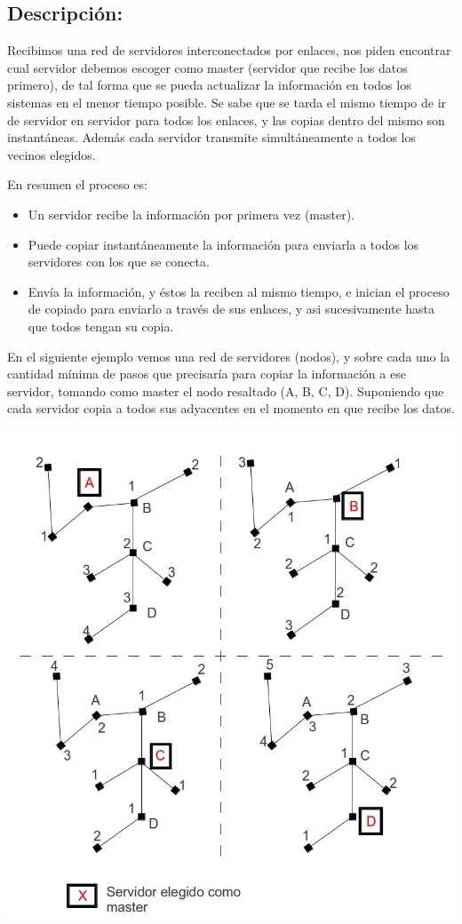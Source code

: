 \subsection{Descripción:}

Recibimos una red de servidores interconectados por enlaces, nos piden encontrar cual servidor debemos escoger como master (servidor que recibe los datos primero), de tal forma que se pueda actualizar la información en todos los sistemas en el menor tiempo posible.
Se sabe que se tarda el mismo tiempo de ir de servidor en servidor para todos los enlaces, y las copias dentro del mismo son instantáneas.
Además cada servidor transmite simultáneamente a todos los vecinos elegidos.

En resumen el proceso es:
\begin{itemize}
\item Un servidor recibe la información por primera vez (master).
\item Puede copiar instantáneamente la información para enviarla a todos los servidores con los que se conecta.
\item Envía la información, y éstos la reciben al mismo tiempo, e inician el proceso de copiado para enviarlo a través de sus enlaces, y asi sucesivamente hasta que todos tengan su copia.
\end{itemize}
En el siguiente ejemplo vemos una red de servidores (nodos), y sobre cada uno la cantidad mínima de pasos que precisaría para copiar la información a ese servidor, tomando como master el nodo resaltado (A, B, C, D). Suponiendo que cada servidor copia a todos sus adyacentes en el momento en que recibe los datos.

\begin{center}
\includegraphics[scale=0.6]{ej2/2/graficos/imagen01.jpg} 
\end{center}


